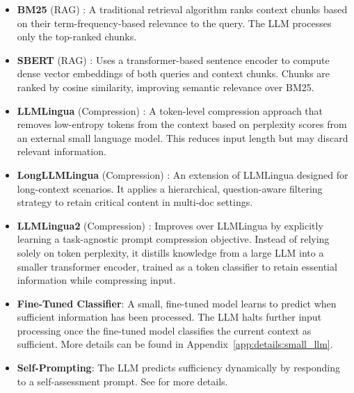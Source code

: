 \begin{itemize}[leftmargin=*,noitemsep,nolistsep]
\setlength{\itemsep}{2pt}
\setlength{\parskip}{2pt}
\setlength{\parsep}{2pt}

\item \textbf{BM25} (RAG) \citep{INR-019}: A traditional retrieval algorithm ranks context chunks based on their term-frequency-based relevance to the query. The LLM processes only the top-ranked chunks.

\item \textbf{SBERT} (RAG) \citep{sbert}: Uses a transformer-based sentence encoder to compute dense vector embeddings of both queries and context chunks. Chunks are ranked by cosine similarity, improving semantic relevance over BM25.

\item \textbf{LLMLingua} (Compression) \citep{llmlingua}: 
A token-level compression approach that removes low-entropy tokens from the context based on perplexity scores from an external small language model. This reduces input length but may discard relevant information.


\item \textbf{LongLLMLingua} (Compression) \citep{longllmlingua}: An extension of LLMLingua designed for long-context scenarios. It applies a hierarchical, question-aware filtering strategy to retain critical content in multi-doc settings.

\item \textbf{LLMLingua2} (Compression) \citep{llmlingua2}: Improves over LLMLingua by explicitly learning a task-agnostic prompt compression objective. Instead of relying solely on token perplexity, it distills knowledge from a large LLM into a smaller transformer encoder, trained as a token classifier to retain essential information while compressing input.

\item \textbf{Fine-Tuned Classifier}: A small, fine-tuned model learns to predict when sufficient information has been processed. The LLM halts further input processing once the fine-tuned model classifies the current context as sufficient. More details can be found in Appendix~\ref{app:details:small_llm}.

\item \textbf{Self-Prompting}: The LLM predicts sufficiency dynamically by responding to a self-assessment prompt. See  for more details. 

\end{itemize}


